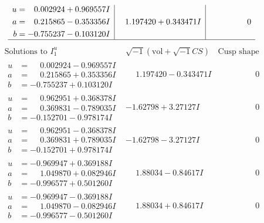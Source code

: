 \documentclass[1p]{elsarticle_modified}
\theoremstyle{definition}
\newcommand{\I}{\sqrt{-1}}
\begin{document}
$$\begin{array}{c|c|c}
\begin{aligned}
u &= \phantom{-}0.002924 + 0.969557 I \\
a &= \phantom{-}0.215865 - 0.353356 I \\
b &= -0.755237 - 0.103120 I\end{aligned}
 & \phantom{-}1.197420 + 0.343471 I & \phantom{-0.000000 } 0\\
 \hline 
 \end{array}$$\newpage$$\begin{array}{c|c|c}  
\text{Solutions to }I^u_{1}& \I (\text{vol} + \sqrt{-1}CS) & \text{Cusp shape}\\
 \hline 
\begin{aligned}
u &= \phantom{-}0.002924 - 0.969557 I \\
a &= \phantom{-}0.215865 + 0.353356 I \\
b &= -0.755237 + 0.103120 I\end{aligned}
 & \phantom{-}1.197420 - 0.343471 I & \phantom{-0.000000 } 0 \\ \hline\begin{aligned}
u &= \phantom{-}0.962951 + 0.368378 I \\
a &= \phantom{-}0.369831 - 0.789035 I \\
b &= -0.152701 - 0.978174 I\end{aligned}
 & -1.62798 + 3.27127 I & \phantom{-0.000000 } 0 \\ \hline\begin{aligned}
u &= \phantom{-}0.962951 - 0.368378 I \\
a &= \phantom{-}0.369831 + 0.789035 I \\
b &= -0.152701 + 0.978174 I\end{aligned}
 & -1.62798 - 3.27127 I & \phantom{-0.000000 } 0 \\ \hline\begin{aligned}
u &= -0.969947 + 0.369188 I \\
a &= \phantom{-}1.049870 + 0.082946 I \\
b &= -0.996577 + 0.501260 I\end{aligned}
 & \phantom{-}1.88034 - 0.84617 I & \phantom{-0.000000 } 0 \\ \hline\begin{aligned}
u &= -0.969947 - 0.369188 I \\
a &= \phantom{-}1.049870 - 0.082946 I \\
b &= -0.996577 - 0.501260 I\end{aligned}
 & \phantom{-}1.88034 + 0.84617 I & \phantom{-0.000000 } 0 \\ \hline\begin{aligned}

\end{aligned}
\end{array}$$
\end{document}
